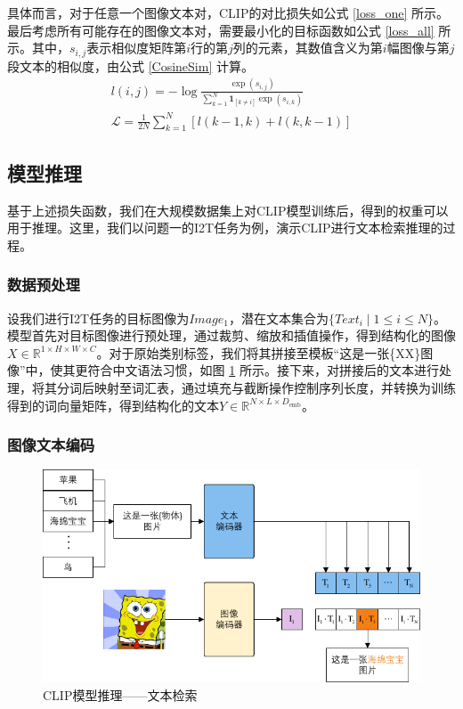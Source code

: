 \documentclass[a4paper]{zreport}
\begin{document}
具体而言，对于任意一个图像文本对，CLIP的对比损失如公式 \eqref{loss_one} 所示。最后考虑所有可能存在的图像文本对，需要最小化的目标函数如公式 \eqref{loss_all} 所示。其中，$s_{i,j}$表示相似度矩阵第$i$行的第$j$列的元素，其数值含义为第$i$幅图像与第$j$段文本的相似度，由公式 \eqref{CosineSim} 计算。
\begin{gather}
l(i,j)=-\log\frac{\exp(s_{i,j})}{\sum_{k=1}^{N} \mathbf{1}_{\left[k \ne i\right]} \exp(s_{i,k})}\label{loss_one}\\
\mathcal{L}=\frac{1}{2N}\sum_{k=1}^N[l(k-1,k)+l(k,k-1)]\label{loss_all}
\end{gather}


\subsection{模型推理} \label{infer}

基于上述损失函数，我们在大规模数据集上对CLIP模型训练后，得到的权重可以用于推理。这里，我们以问题一的I2T任务为例，演示CLIP进行文本检索推理的过程。

\subsubsection{数据预处理}

设我们进行I2T任务的目标图像为$Image_1$，潜在文本集合为$\{Text_i \mid 1 \le i \le N\}$。模型首先对目标图像进行预处理，通过裁剪、缩放和插值操作，得到结构化的图像 $X \in \mathbb{R}^{1 \times H \times W \times C}$。对于原始类别标签，我们将其拼接至模板“这是一张\{XX\}图像”中，使其更符合中文语法习惯，如图 \ref{fig:clip2} 所示。接下来，对拼接后的文本进行处理，将其分词后映射至词汇表，通过填充与截断操作控制序列长度，并转换为训练得到的词向量矩阵，得到结构化的文本$Y \in \mathbb{R}^{N \times L \times D_\mathrm{emb}}$。

\subsubsection{图像文本编码}

\begin{figure}[h]
\centering
\includegraphics[width=0.9\linewidth]{figures/clip2}
\caption{CLIP模型推理——文本检索}
\label{fig:clip2}
\end{figure}
\end{document}
